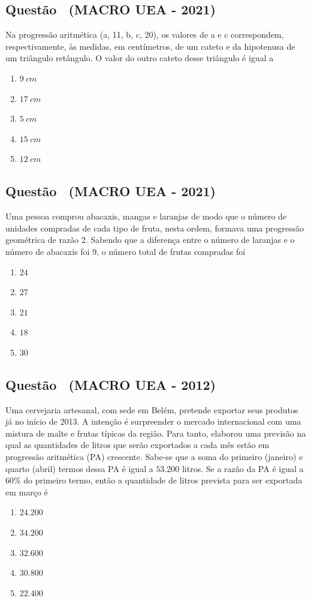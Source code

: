 \documentclass[12pt]{article}
\newcounter{questao}
\newcommand{\novaquestao}[1]{%
  \stepcounter{questao}%
  \subsection*{Questão \thequestao\ (#1)}%
}
\begin{document}
\begin{multicols}{2}
        \novaquestao{MACRO UEA - 2021}
            Na progressão aritmética (a, 11, b, c, 20), os valores de a e c correspondem, respectivamente, às medidas, em centímetros, de um cateto e da hipotenusa de um triângulo retângulo. O valor do outro cateto desse triângulo é igual a
        
            \begin{enumerate}[label=(\alph*), noitemsep]
                \item $9 \ cm$
                \item $17 \ cm$
                \item $5 \ cm$
                \item $15 \ cm$
                \item $12 \ cm$
            \end{enumerate}
        
        \novaquestao{MACRO UEA - 2021}
            Uma pessoa comprou abacaxis, mangas e laranjas de modo que o número de unidades compradas de cada tipo de fruta, nesta ordem, formava uma progressão geométrica de razão 2. Sabendo que a diferença entre o número de laranjas e o número de abacaxis foi 9, o número total de frutas compradas foi
        
            \begin{enumerate}[label=(\alph*), noitemsep]
                \item $24$
                \item $27$
                \item $21$
                \item $18$
                \item $30$
            \end{enumerate}
        
        \novaquestao{MACRO UEA - 2012}
        
            Uma cervejaria artesanal, com sede em Belém, pretende exportar seus produtos já no início de 2013. A intenção é surpreender o mercado internacional com uma mistura de malte e frutas típicas da região. Para tanto, elaborou uma previsão na qual as quantidades de litros que serão exportados a cada mês estão em progressão aritmética (PA) crescente. Sabe-se que a soma do primeiro (janeiro) e quarto (abril) termos dessa PA é igual a $53.200$ litros. Se a razão da PA é igual a $60\%$ do primeiro termo, então a quantidade de litros prevista para ser exportada em março é
        
            \begin{enumerate}[label=(\alph*), noitemsep]
                \item $24.200$
                \item $34.200$
                \item $32.600$
                \item $30.800$
                \item $22.400$
            \end{enumerate}
        

\end{multicols}
\end{document}
